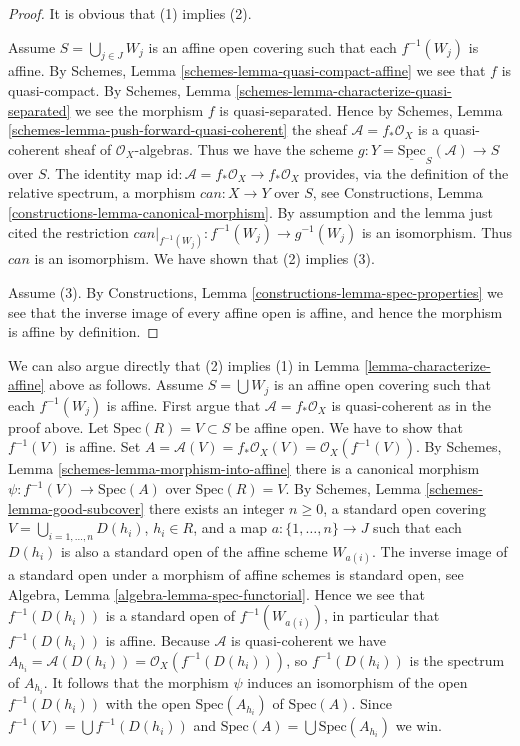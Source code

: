 \begin{proof}
It is obvious that (1) implies (2).

\medskip\noindent
Assume $S = \bigcup_{j \in J} W_j$ is an affine open covering such that
each $f^{-1}(W_j)$ is affine. By
Schemes, Lemma \ref{schemes-lemma-quasi-compact-affine} we see
that $f$ is quasi-compact. By
Schemes, Lemma \ref{schemes-lemma-characterize-quasi-separated}
we see the morphism $f$ is quasi-separated. Hence by
Schemes, Lemma \ref{schemes-lemma-push-forward-quasi-coherent} the
sheaf $\mathcal{A} = f_*\mathcal{O}_X$ is a quasi-coherent sheaf
of $\mathcal{O}_X$-algebras. Thus we have the scheme
$g : Y = \underline{\text{Spec}}_S(\mathcal{A}) \to S$ over $S$.
The identity map
$\text{id} : \mathcal{A} = f_*\mathcal{O}_X \to f_*\mathcal{O}_X$
provides, via the definition of the relative spectrum,
a morphism $can : X \to Y$ over $S$, see
Constructions, Lemma \ref{constructions-lemma-canonical-morphism}.
By assumption and the lemma just cited
the restriction $can|_{f^{-1}(W_j)} : f^{-1}(W_j) \to g^{-1}(W_j)$
is an isomorphism. Thus $can$ is an isomorphism.
We have shown that (2) implies (3).

\medskip\noindent
Assume (3). By Constructions, Lemma \ref{constructions-lemma-spec-properties}
we see that the inverse image of every affine open is affine, and hence
the morphism is affine by definition.
\end{proof}

\begin{remark}
\label{remark-direct-argument}
We can also argue directly that (2) implies (1) in
Lemma \ref{lemma-characterize-affine} above as follows.
Assume $S = \bigcup W_j$ is an affine open covering
such that each $f^{-1}(W_j)$ is affine.
First argue that $\mathcal{A} = f_*\mathcal{O}_X$ is quasi-coherent
as in the proof above.
Let $\text{Spec}(R) = V \subset S$ be affine open.
We have to show that $f^{-1}(V)$ is affine. Set
$A = \mathcal{A}(V) = f_*\mathcal{O}_X(V) = \mathcal{O}_X(f^{-1}(V))$.
By Schemes, Lemma \ref{schemes-lemma-morphism-into-affine} there is
a canonical morphism $\psi : f^{-1}(V) \to \text{Spec}(A)$ over
$\text{Spec}(R) = V$.
By Schemes, Lemma \ref{schemes-lemma-good-subcover} there exists
an integer $n \geq 0$, a standard open covering
$V = \bigcup_{i = 1, \ldots, n} D(h_i)$, $h_i \in R$, and a map
$a : \{1, \ldots, n\} \to J$ such that each $D(h_i)$ is also
a standard open of the affine scheme $W_{a(i)}$. The inverse image
of a standard open under a morphism of affine schemes is standard open, see
Algebra, Lemma \ref{algebra-lemma-spec-functorial}. Hence we see
that $f^{-1}(D(h_i))$ is a standard open of $f^{-1}(W_{a(i)})$,
in particular that $f^{-1}(D(h_i))$ is affine. Because $\mathcal{A}$
is quasi-coherent we have
$A_{h_i} = \mathcal{A}(D(h_i)) = \mathcal{O}_X(f^{-1}(D(h_i)))$,
so $f^{-1}(D(h_i))$ is the spectrum of $A_{h_i}$.
It follows that the morphism $\psi$ induces an isomorphism of the open
$f^{-1}(D(h_i))$ with the open $\text{Spec}(A_{h_i})$ of
$\text{Spec}(A)$. Since $f^{-1}(V) = \bigcup f^{-1}(D(h_i))$
and $\text{Spec}(A) = \bigcup \text{Spec}(A_{h_i})$ we win.
\end{remark}


